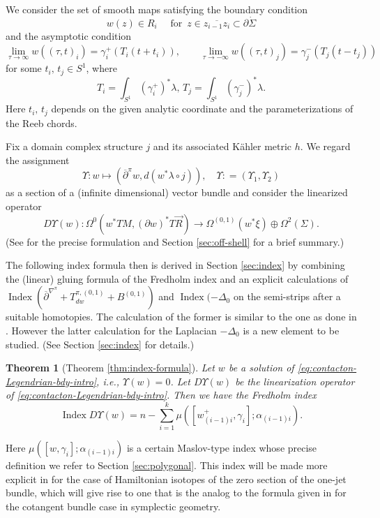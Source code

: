 \documentclass[reqno]{amsart}
\newcommand{\del}{\partial}
\newcommand{\be}{\begin{equation}}
\newcommand{\ee}{\end{equation}}
\theoremstyle{theorem}
\newtheorem{thm}{Theorem}[section]
\theoremstyle{definition}
\numberwithin{equation}{section}
\def\delbar{{\overline \partial}}
\def\delbar{{\overline \partial}}
\begin{document}
We consider the set of smooth maps satisfying the boundary condition
\be\label{eq:bdy-condition}
w(z) \in R_i \quad \text{ for } \, z \in \overline{z_{i-1}z_i} \subset \del \dot \Sigma
\ee
and the asymptotic condition
\be\label{eq:asymp-condition}
\lim_{\tau \to \infty}w((\tau,t)_i) = \gamma^+_i(T_i(t+t_i)), \qquad
\lim_{\tau \to - \infty}w((\tau,t)_j) = \gamma^-_j(T_j(t-t_j))
\ee
for some $t_i, \, t_j \in S^1$, where
$$
T_i = \int_{S^1} (\gamma^+_i)^*\lambda, \, T_j = \int_{S^1} ( \gamma^-_j)^*\lambda.
$$
Here $t_i,\, t_j$ depends on the given analytic coordinate and the parameterizations of
the Reeb chords.

Fix a domain complex structure $j$ and its associated K\"ahler metric $h$.
We regard the assignment
$$
\Upsilon: w \mapsto \left(\delbar^\pi w, d(w^*\lambda \circ j)\right), \quad
\Upsilon: = (\Upsilon_1,\Upsilon_2)
$$
as a section of a (infinite dimensional) vector bundle and consider
the linearized operator
$$
D\Upsilon(w): \Omega^0(w^*TM,(\del w)^*T\vec R) \to \Omega^{(0,1)}(w^*\xi) \oplus \Omega^2(\Sigma).
$$
(See \cite{oh:contacton-transversality} for the precise formulation and Section \ref{sec:off-shell}
for a brief summary.)

The following index formula then is derived in Section \ref{sec:index}
by combining the (linear) gluing formula of the Fredholm index and
an explicit calculations of $\operatorname{Index}(\delbar^{\nabla^\pi} + T_{dw}^{\pi,(0,1)}+ B^{(0,1)})$
and $\operatorname{Index}(-\Delta_0$ on the semi-strips after a suitable
homotopies. The calculation of the former is
similar to the one as done in \cite{fooo:anchored}. However the latter calculation for the
Laplacian $-\Delta_0$ is a new element to be studied. (See Section \ref{sec:index} for details.)

\begin{thm}[Theorem \ref{thm:index-formula}]\label{thm:index-intro}
Let $w$ be a solution of \eqref{eq:contacton-Legendrian-bdy-intro}, i.e., $\Upsilon(w) = 0$.
Let $D\Upsilon(w)$ be the linearization operator of \eqref{eq:contacton-Legendrian-bdy-intro}.
Then we have the Fredholm index
$$
\operatorname{Index}D\Upsilon(w) = n - \sum_{i=1}^{k}\mu([w_{(i-1)i}^+,\gamma_i];\alpha_{(i-1)i}).
$$
\end{thm}
Here $\mu([w,\gamma_i];\alpha_{(i-1)i})$ is a  certain
Maslov-type index whose precise definition we refer to Section \ref{sec:polygonal}.
This index will be made more explicit in \cite{oh-yso:spectral}
for the case of Hamiltonian isotopes of the zero section of the one-jet bundle,
which will give rise to one that is the analog to the formula given in \cite{oh:jdg}
for the cotangent bundle case in symplectic geometry.
\end{document}
